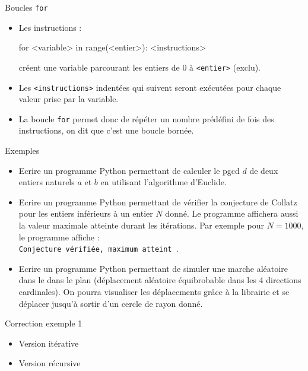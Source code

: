 \documentclass[10pt]{beamer}
\begin{document}
\begin{frame}[fragile]{\Ctitle}{\stitle}
	\begin{alertblock}{Boucles {\tt for}}
		\begin{itemize}
			\item<2-> Les instructions :
			      \begin{codepython}
	for <variable> in range(<entier>):
		 <instructions>
	\end{codepython}
			      créent une variable parcourant les entiers de 0 à {\tt <entier>} (exclu).
			\item<3-> Les {\tt <instructions>} indentées qui suivent seront exécutées pour chaque valeur prise par la variable.
			\item<4-> La boucle {\tt for} permet donc de répéter un nombre prédéfini de fois des instructions, on dit que c'est une boucle bornée.
		\end{itemize}
	\end{alertblock}
\end{frame}

\begin{frame}[fragile]{\Ctitle}{\stitle}
	\begin{exampleblock}{Exemples}
		\begin{itemize}
			\item<1-> Ecrire un programme Python permettant de calculer le {\sc pgcd} $d$ de deux entiers naturels $a$ et $b$ en utilisant l'algorithme d'Euclide.
			\item<2-> Ecrire un programme Python permettant de vérifier la conjecture de Collatz pour les entiers inférieurs à un entier $N$ donné. Le programme affichera aussi la valeur maximale atteinte durant les itérations. Par exemple pour $N=1000$, le programme affiche : \\
			{\tt Conjecture vérifiée, maximum atteint }. 
			\item<3-> Ecrire un programme Python permettant de simuler une marche aléatoire dans le dans le plan (déplacement aléatoire équibrobable dans les 4 directions cardinales). On pourra visualiser les déplacements grâce à la librairie  et se déplacer jusqu'à sortir d'un cercle de rayon donné.
		\end{itemize}
	\end{exampleblock}
\end{frame}

\begin{frame}[fragile]{\Ctitle}{\stitle}
	\begin{exampleblock}{Correction exemple 1}
		\begin{itemize}
			\item<1-> Version itérative
			\item<2-> Version récursive
		\end{itemize}
	\end{exampleblock}
\end{frame}
\end{document}
